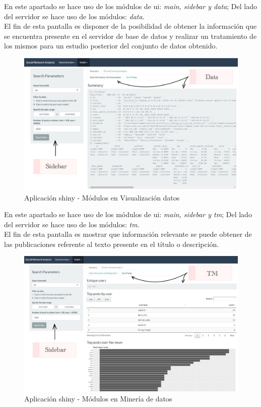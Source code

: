 \documentclass[../../main.tex]{subfiles}
\begin{document}
En este apartado se hace uso de los módulos de \gls{ui}: \textit{main, sidebar y data}; Del lado del servidor se hace uso de los módulos: \textit{data}.  \\
El fin de esta pantalla es disponer de la posibilidad de obtener la información que se encuentra presente en el servidor de base de datos y realizar un tratamiento de los mismos para un estudio posterior del conjunto de datos obtenido.

\begin{figure}[H]
\centering
\includegraphics[width=400pt]{images/implementacion/app-2.jpg}
\caption{Aplicación \Gls{shiny} - Módulos en Visualización datos}
\end{figure}

En este apartado se hace uso de los módulos de \gls{ui}: \textit{main, sidebar y tm}; Del lado del servidor se hace uso de los módulos: \textit{tm}.  \\
El fin de esta pantalla es mostrar que información relevante se puede obtener de las publicaciones referente al texto presente en el título o descripción.

\begin{figure}[H]
\centering
\includegraphics[width=400pt]{images/implementacion/app-3.jpg}
\caption{Aplicación \Gls{shiny} - Módulos en Minería de datos}
\end{figure}
\end{document}
